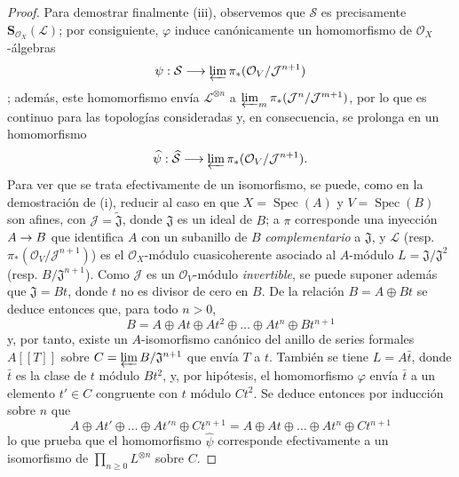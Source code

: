 \documentclass[oneside,10pt]{amsart}
\makeatletter
\newcommand{\ega@arrow}[2]{\mathchoice{#1}{#2}{#2}{#2}}
\renewcommand{\to}{\ega@arrow{\longrightarrow}{\rightarrow}}
\makeatother
\begin{document}
\begin{proof}
Para demostrar finalmente (iii), observemos que $\mathcal{S}$ es precisamente $\mathbf{S}_{\mathcal{O}_X}(\mathcal{L})$;
por consiguiente, $\varphi$ induce canónicamente un homomorfismo de $\mathcal{O}_X$-álgebras
\[
  \psi:\mathcal{S}\longrightarrow
  \varprojlim\pi_*(\mathcal{O}_V/\mathcal{J}^{n+1})
\]
;
además, este homomorfismo envía $\mathcal{L}^{\otimes n}$ a $\varprojlim_m\pi_*(\mathcal{J}^n/\mathcal{J}^{m+1})$, por lo que es continuo para las topologías consideradas y, en consecuencia, se prolonga en un homomorfismo
\[
  \widehat{\psi}:\widehat{\mathcal{S}}\longrightarrow
  \varprojlim\pi_*(\mathcal{O}_V/\mathcal{J}^{n+1}).
\]
Para ver que se trata efectivamente de un isomorfismo, se puede, como en la demostración de (i), reducir al caso en que $X=\operatorname{Spec}(A)$ y $V=\operatorname{Spec}(B)$ son afines, con $\mathcal{J}=\widetilde{\mathfrak{J}}$, donde $\mathfrak{J}$ es un ideal de $B$;
a $\pi$ corresponde una inyección $A\to B$ que identifica $A$ con un subanillo de $B$ \emph{complementario} a $\mathfrak{J}$, y $\mathcal{L}$ (resp. $\pi_*(\mathcal{O}_V/\mathcal{J}^{n+1})$) es el $\mathcal{O}_X$-módulo cuasicoherente asociado al $A$-módulo $L=\mathfrak{J}/\mathfrak{J}^2$ (resp. $B/\mathfrak{J}^{n+1}$).
Como $\mathcal{J}$ es un $\mathcal{O}_V$-módulo \emph{invertible}, se puede suponer además que $\mathfrak{J}=Bt$, donde $t$ no es divisor de cero en $B$.
De la relación $B=A\oplus Bt$ se deduce entonces que, para todo $n>0$,
\[
  B=A\oplus At\oplus At^2\oplus\ldots\oplus At^n\oplus Bt^{n+1}
\]
y, por tanto, existe un $A$-isomorfismo canónico del anillo de series formales $A[[T]]$ sobre $C=\varprojlim B/\mathfrak{J}^{n+1}$ que envía $T$ a $t$.
También se tiene $L=A\bar t$, donde $\bar t$ es la clase de $t$ módulo $Bt^2$, y, por hipótesis, el homomorfismo $\varphi$ envía $\bar t$ a un elemento $t'\in C$ congruente con $t$ módulo $Ct^2$.
Se deduce entonces por inducción sobre $n$ que
\[
  A\oplus At'\oplus\ldots\oplus At'{}^n\oplus Ct^{n+1}
  =A\oplus At\oplus\ldots\oplus At^n\oplus Ct^{n+1}
\]
lo que prueba que el homomorfismo $\widehat{\psi}$ corresponde efectivamente a un isomorfismo de $\prod_{n\geqslant0}L^{\otimes n}$ sobre $C$.
\end{proof}
\end{document}

